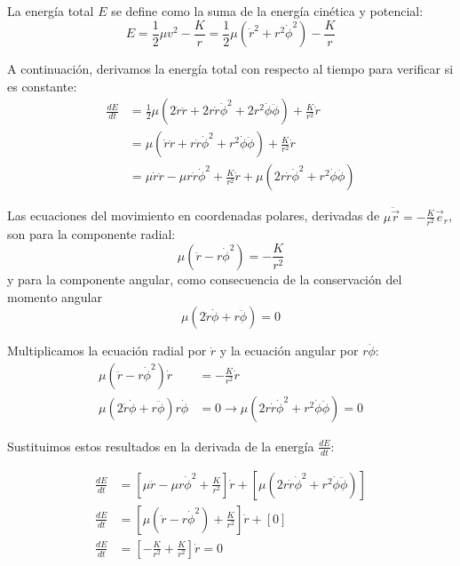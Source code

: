 \documentclass[openany]{book}
\theoremstyle{ucostyle}
\begin{document}
La energía total $E$ se define como la suma de la energía cinética y potencial:
\begin{equation*}
E = \frac{1}{2}\mu v^2 - \frac{K}{r} = \frac{1}{2}\mu (\dot{r}^2 + r^2\dot{\phi}^2) - \frac{K}{r}
\end{equation*}

A continuación, derivamos la energía total con respecto al tiempo para verificar si es constante:
\begin{align*}
\frac{dE}{dt} &= \frac{1}{2}\mu(2\dot{r}\ddot{r} + 2r\dot{r}\dot{\phi}^2 + 2r^2\dot{\phi}\ddot{\phi}) + \frac{K}{r^2}\dot{r} \\
&= \mu(\dot{r}\ddot{r} + r\dot{r}\dot{\phi}^2 + r^2\dot{\phi}\ddot{\phi}) + \frac{K}{r^2}\dot{r} \\
&= \mu\dot{r}\ddot{r} - \mu r\dot{r}\dot{\phi}^2 + \frac{K}{r^2}\dot{r} + \mu(2r\dot{r}\dot{\phi}^2 + r^2\dot{\phi}\ddot{\phi}) 
\end{align*}

Las ecuaciones del movimiento en coordenadas polares, derivadas de \(\mu\ddot{\vec{r}} = -\frac{K}{r^2}\vec{e}_r\), son para la componente radial: 
\begin{equation}
    \mu(\ddot{r} - r\dot{\phi}^2) = -\frac{K}{r^2} 
\end{equation}
y para la componente angular, como consecuencia de la conservación del momento angular
\begin{equation}
    \mu(2\dot{r}\dot{\phi} + r\ddot{\phi}) = 0 
\end{equation}

Multiplicamos la ecuación radial por \(\dot{r}\) y la ecuación angular por \(r\dot{\phi}\):
\begin{align*}
\mu(\ddot{r} - r\dot{\phi}^2)\dot{r} &= -\frac{K}{r^2}\dot{r} \\
\mu(2\dot{r}\dot{\phi} + r\ddot{\phi})r\dot{\phi} &= 0 \rightarrow \mu(2r\dot{r}\dot{\phi}^2 + r^2\dot{\phi}\ddot{\phi}) = 0
\end{align*}

Sustituimos estos resultados en la derivada de la energía \(\frac{dE}{dt}\):

\begin{align*}
\frac{dE}{dt} &= \left[ \mu\ddot{r} - \mu r\dot{\phi}^2 + \frac{K}{r^2} \right]\dot{r} + \left[ \mu(2r\dot{r}\dot{\phi}^2 + r^2\dot{\phi}\ddot{\phi}) \right] \\
\frac{dE}{dt} &= \left[ \mu(\ddot{r} - r\dot{\phi}^2) + \frac{K}{r^2} \right]\dot{r} + [0] \\
\frac{dE}{dt} &= \left[ -\frac{K}{r^2} + \frac{K}{r^2} \right]\dot{r} = 0
\end{align*}
\end{document}

